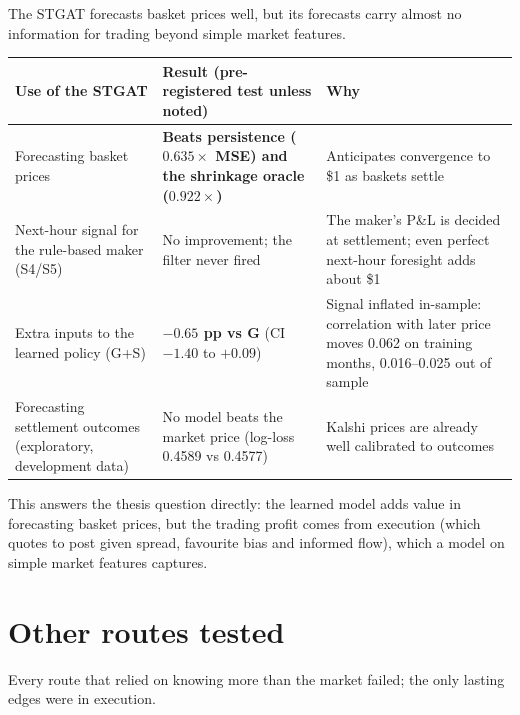 \documentclass[11pt,a4paper]{article}
\begin{document}
The STGAT forecasts basket prices well, but its forecasts carry almost no information for trading beyond simple
market features.

\begin{center}
\small
\begin{tabularx}{\textwidth}{>{\raggedright\arraybackslash}p{3.6cm} L L}
\toprule
Use of the STGAT & Result (pre-registered test unless noted) & Why \\
\midrule
Forecasting basket prices & \textbf{\boldmath Beats persistence ($0.635\times$ MSE) and the shrinkage oracle ($0.922\times$)}
  & Anticipates convergence to \$1 as baskets settle \\
Next-hour signal for the rule-based maker (S4/S5) & No improvement; the filter never fired
  & The maker's P\&L is decided at settlement; even perfect next-hour foresight adds about \$1 \\
Extra inputs to the learned policy (G+S) & \textbf{\boldmath $-0.65$ pp vs G} (CI $-1.40$ to $+0.09$)
  & Signal inflated in-sample: correlation with later price moves 0.062 on training months, 0.016--0.025 out of sample \\
Forecasting settlement outcomes (exploratory, development data) & No model beats the market price (log-loss 0.4589 vs 0.4577)
  & Kalshi prices are already well calibrated to outcomes \\
\bottomrule
\end{tabularx}
\end{center}

\noindent This answers the thesis question directly: the learned model adds value in forecasting basket prices,
but the trading profit comes from execution (which quotes to post given spread, favourite bias and informed flow),
which a model on simple market features captures.

\section{Other routes tested}

Every route that relied on knowing more than the market failed; the only lasting edges were in execution.
\end{document}

